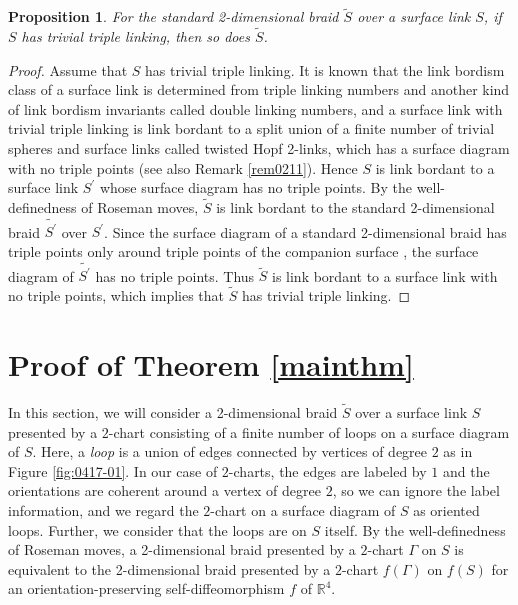 \documentclass[a4paper,11pt]{amsart}
\numberwithin{equation}{section}
\newtheorem{proposition}[theorem]{Proposition}
\begin{document}
\begin{proposition}\label{prop:tlk}
For the standard 2-dimensional braid $\tilde{S}$ over a surface link $S$, if $S$ has trivial triple linking, then so does $\tilde{S}$. 
\end{proposition}

\begin{proof}
Assume that $S$ has trivial triple linking. 
It is known \cite{CKSS01} that the link bordism class of a surface link is determined from triple linking numbers and another kind of link bordism invariants called double linking numbers, and a surface link with trivial triple linking is link bordant to a split union of a finite number of trivial spheres and surface links called twisted Hopf 2-links, which has a surface diagram with no triple points (see also Remark \ref{rem0211}). 
 Hence $S$ is link bordant to a surface link $S^\prime$ whose surface diagram has no triple points. By the well-definedness of Roseman moves, $\widetilde{S}$ is link bordant to the standard 2-dimensional braid $\widetilde{S^\prime}$ over $S^\prime$. Since the surface diagram of a standard 2-dimensional braid has triple points only around triple points of the companion surface \cite{N4}, the surface diagram of $\widetilde{S^\prime}$ has no triple points. Thus $\widetilde{S}$ is link bordant to a surface link with no triple points, which implies that $\widetilde{S}$ has trivial triple linking.
\end{proof}
  




\section{Proof of Theorem \ref{mainthm}}\label{sec:6}

In this section, we will consider a 2-dimensional braid $\widetilde{S}$ over a surface link $S$ presented by a $2$-chart consisting of a finite number of loops on a surface diagram of $S$. Here, a {\it loop} is a union of edges connected by vertices of degree $2$ as in Figure \ref{fig:0417-01}. 
In our case of $2$-charts, the edges are labeled by $1$ and the orientations are coherent around a vertex of degree $2$, so we can ignore the label information, and we regard the $2$-chart on a surface diagram of $S$ as oriented loops. Further, we consider that the loops are on $S$ itself. 
By the well-definedness of Roseman moves, a 2-dimensional braid presented by a $2$-chart $\Gamma$ on $S$ is equivalent to the 2-dimensional braid presented by a $2$-chart $f(\Gamma)$ on $f(S)$ for an orientation-preserving self-diffeomorphism $f$ of $\mathbb{R}^4$. 
 
\end{document}
